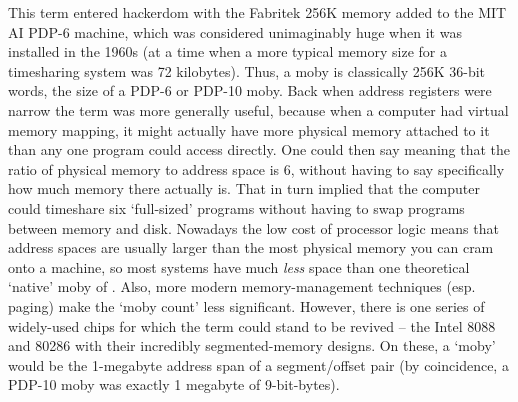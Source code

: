 This term entered hackerdom with the Fabritek 256K memory added to the MIT AI
PDP-6 machine, which was considered unimaginably huge when it was installed in
the 1960s (at a time when a more typical memory size for a timesharing system
was 72 kilobytes). Thus, a moby is classically 256K 36-bit words, the size of a
PDP-6 or PDP-10 moby. Back when address registers were narrow the term was more
generally useful, because when a computer had virtual memory mapping, it might
actually have more physical memory attached to it than any one program could
access directly. One could then say 
meaning that the ratio of physical memory to address space is 6, without having
to say specifically how much memory there actually is. That in turn implied
that the computer could timeshare six `full-sized' programs without having to
swap programs between memory and disk.  Nowadays the low cost of processor
logic means that address spaces are usually larger than the most physical
memory you can cram onto a machine, so most systems have much \textit{less}
space than one theoretical `native' moby of . Also, more modern
memory-management techniques (esp. paging) make the `moby count' less
significant. However, there is one series of widely-used chips for which the
term could stand to be revived -- the Intel 8088 and 80286 with their
incredibly  segmented-memory designs. On these, a
`moby' would be the 1-megabyte address span of a segment/offset pair (by
coincidence, a PDP-10 moby was exactly 1 megabyte of 9-bit-bytes).

